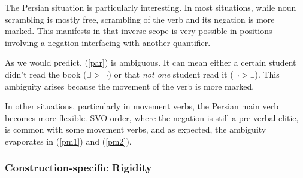 \documentclass{article}
\begin{document}
\begin{exe}
\end{exe}

The Persian situation is particularly interesting. In most situations, while noun scrambling is mostly free, scrambling of the verb and its negation is more marked. This manifests in that inverse scope is very possible in positions involving a negation interfacing with another quantifier.

\begin{exe}
\end{exe}

As we would predict, (\ref{par}) is ambiguous. It can mean either a certain student didn't read the book ($\exists > \neg$) or that \emph{not one} student read it ($\neg > \exists$). This ambiguity arises because the movement of the verb is more marked.

In other situations, particularly in movement verbs, the Persian main verb becomes more flexible. SVO order, where the negation is still a pre-verbal clitic, is common with some movement verbs, and as expected, the ambiguity evaporates in (\ref{pm1}) and (\ref{pm2}).

\begin{exe}
\end{exe}


\subsubsection{Construction-specific Rigidity}
\end{document}
